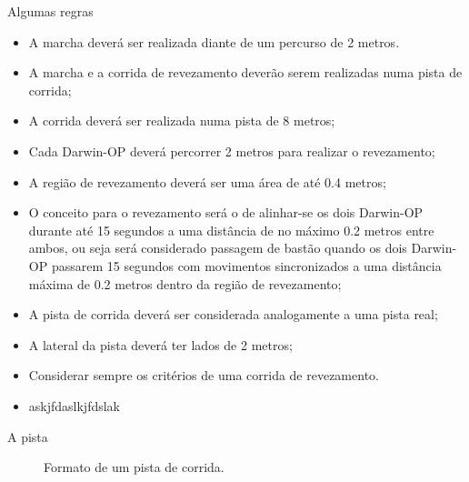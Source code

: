 \begin{frame}[t]{Algumas regras}
    \begin{itemize}
        \item A marcha deverá ser realizada diante de um percurso de 2 metros.
        \item A marcha e a corrida de revezamento deverão serem realizadas numa pista de corrida;
        \item A corrida deverá ser realizada numa pista de 8 metros;
        \item Cada Darwin-OP deverá percorrer 2 metros para realizar o revezamento;
        \item A região de revezamento deverá ser uma área de até 0.4 metros;
        \item O conceito para o revezamento será o de alinhar-se os dois Darwin-OP durante até 15 segundos a uma distância de no máximo 0.2 metros entre ambos, ou seja será considerado passagem de bastão quando os dois Darwin-OP passarem 15 segundos com movimentos sincronizados a uma distância máxima de 0.2 metros dentro da região de revezamento;
        \item A pista de corrida deverá ser considerada analogamente a uma pista real;
        \item A lateral da pista deverá ter lados de 2 metros;
        \item Considerar sempre os critérios de uma corrida de revezamento.
        \item askjfdaslkjfdslak
    \end{itemize}
   
\end{frame}
\begin{frame}[c]{A pista}
    \begin{figure}
       
          
        \caption{Formato de um pista de corrida.\cite{agostini2007}}
    \end{figure}
\end{frame}
